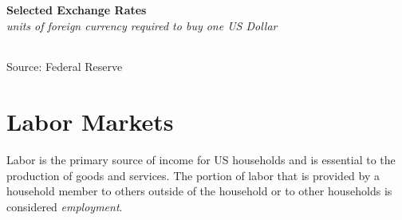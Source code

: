 \documentclass{report}
\begin{document}
{\begin{minipage}{0.375\textwidth}

\end{minipage}
\newpage
\begin{minipage}{0.76\textwidth}
\normalsize \textbf{Selected Exchange Rates}\\
\footnotesize{\textit{units of foreign currency required to buy one US Dollar}}\\
 \setlength{\tabcolsep}{3.0pt} \color{black!90}
	{\renewcommand{\arraystretch}{1.52}
		\begin{tabular}{p{16mm} R{15mm} R{15mm} R{15mm} R{14.5mm} 
		 				 R{14.5mm} R{14.5mm}}
			  \hline
		\end{tabular}}\vspace{-2mm}
		
\footnotesize{Source: Federal Reserve}
\end{minipage}
\newpage
\section*{\color{darkgray}\LARGE Labor Markets}
\label{sec:lab}
\begin{minipage}{0.34\textwidth}
\small Labor is the primary source of income for US households and is essential to the production of goods and services. The portion of labor that is provided by a household member to others outside of the household or to other households is considered \textit{employment}. 


\end{minipage}}
\end{document}
